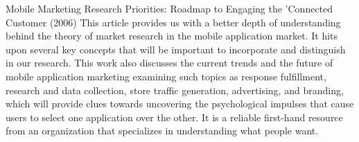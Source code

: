 Mobile Marketing Research Priorities: Roadmap to Engaging the 'Connected Customer (2006)
This article provides us with a better depth of understanding behind the theory of market research in the mobile application market. It hits upon several key concepts that will be important to incorporate and distinguish in our research.  This work also discusses the current trends and the future of mobile application marketing examining such topics as response fulfillment, research and data collection, store traffic generation, advertising, and branding, which will provide clues towards uncovering the psychological impulses that cause users to select one application over the other. It is a reliable first-hand resource from an organization that specializes in understanding what people want.